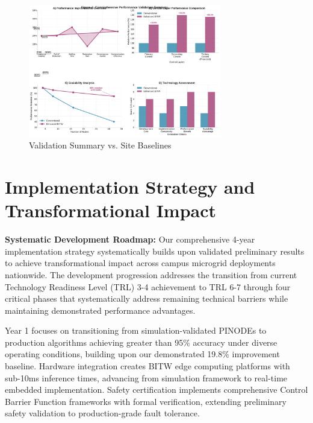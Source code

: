 \documentclass[12pt]{article}
\begin{document}
\begin{figure}[H]
\centering
\includegraphics[width=0.75\textwidth]{figure4_performance_summary.pdf}
\caption{Validation Summary vs. Site Baselines}
\end{figure}

\section{Implementation Strategy and Transformational Impact}

\textbf{Systematic Development Roadmap:} Our comprehensive 4-year implementation strategy systematically builds upon validated preliminary results to achieve transformational impact across campus microgrid deployments nationwide. The development progression addresses the transition from current Technology Readiness Level (TRL) 3-4 achievement to TRL 6-7 through four critical phases that systematically address remaining technical barriers while maintaining demonstrated performance advantages.

Year 1 focuses on transitioning from simulation-validated PINODEs to production algorithms achieving greater than 95\% accuracy under diverse operating conditions, building upon our demonstrated 19.8\% improvement baseline. Hardware integration creates BITW edge computing platforms with sub-10ms inference times, advancing from simulation framework to real-time embedded implementation. Safety certification implements comprehensive Control Barrier Function frameworks with formal verification, extending preliminary safety validation to production-grade fault tolerance.
\end{document}
